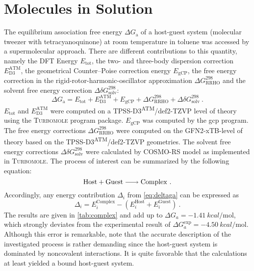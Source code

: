 \documentclass[a4paper,12pt, parskip=half]{scrartcl}
\begin{document}
\section{Molecules in Solution}
%
The equilibrium association free energy $ \Delta G_\mathrm{a} $ of a host-guest system (molecular tweezer with tetracyanoquinone) at room temperature in toluene was accessed by a supermolecular approach. There are different contributions to this quantity, namely the DFT Energy $ E_\mathrm{tot} $, the two- and three-body dispersion correction $ E_\mathrm{D3}^\mathrm{ATM} $, the geometrical Counter--Poise correction energy $ E_\mathrm{gCP} $, the free energy correction in the rigid-rotor-harmonic-oscillator approximation $ \Delta G_\mathrm{RRHO}^{298} $ and the solvent free energy correction $ \Delta \delta G_\mathrm{solv}^{298} $:
%
\begin{equation}
	\label{eq:deltaga}
	\Delta G_\mathrm{a} =  E_\mathrm{tot} + E_\mathrm{D3}^\mathrm{ATM} + E_\mathrm{gCP} + \Delta G_\mathrm{RRHO}^{298} +  \Delta \delta G_\mathrm{solv}^{298}~.
\end{equation}
%
$ E_\mathrm{tot} $ and $ E_\mathrm{D3}^\mathrm{ATM} $ were computed on a TPSS\autocite[]{tpss}-D3\textsuperscript{ATM}\autocite[]{dftd3,dftd3-bj}/def2-TZVP\autocite[]{def2-tzvp} level of theory using the \textsc{Turbomole} program package. $ E_\mathrm{gCP} $ was computed by the gcp\autocite[]{gcp} program. The free energy corrections $ \Delta G_\mathrm{RRHO}^{298} $ were computed on the GFN2-xTB\autocite[]{gfn2-xtb}-level of theory based on the TPSS-D3\textsuperscript{ATM}/def2-TZVP geometries. The solvent free energy corrections $ \Delta \delta G_\mathrm{solv}^{298} $ were calculated by COSMO-RS model as implemented in \textsc{Turbomole}\autocite[]{cosmotherm}. The process of interest can be summarized by the following equation:
%
\begin{equation}
	\ce{Host + Guest -> Complex}~.
\end{equation}
%
Accordingly, any energy contribution $ \Delta_i $  from \autoref{eq:deltaga} can be expressed as
%
\begin{equation}
	\Delta_i = E^\mathrm{Complex}_i - (E^\mathrm{Host}_i + E^\mathrm{Guest}_i)~.
\end{equation}
%
The results are given in \autoref{tab:complex} and add up to $ \Delta G_a = \SI[]{-1.41}{kcal\per\mole} $, which strongly deviates from the experimental result of $ \Delta G_a^\mathrm{exp} = \SI[]{-4.50}{kcal\per\mole} $. Although this error is remarkable, note that the accurate description of the investigated process is rather demanding since the host-guest system is dominated by noncovalent interactions. It is quite favorable that the calculations at least yielded a bound host-guest system.
\end{document}

